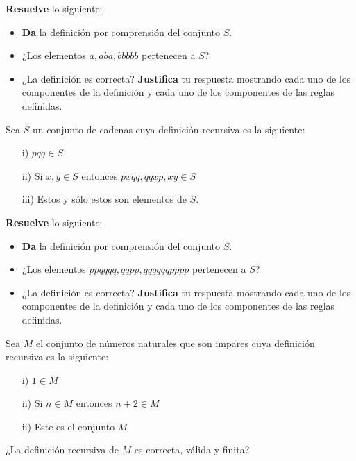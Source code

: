 \documentclass[oneside]{style}
\begin{document}
\begin{questions}[label=\protect\circled{\bfseries\arabic*}]
{        \textbf{Resuelve} lo siguiente:
        \begin{itemize}
            \item \textbf{Da} la definición por comprensión del conjunto 
            $S$.
            \item ¿Los elementos $a, aba, bbbbb$ pertenecen a $S$?
            \item ¿La definición es correcta? \textbf{Justifica} tu respuesta 
            mostrando cada uno de los componentes de la definición y cada uno 
            de los componentes de las reglas definidas.  
        \end{itemize}
    }

    \question
    {
        Sea $S$ un conjunto de cadenas cuya definición recursiva es 
        la siguiente:
        \begin{itemize}
            \item[i)] $pqq \in S$
            \item[ii)] Si $x,y \in S$ entonces $pxqq,qqxp,xy \in S$
            \item[iii)] Estos y sólo estos son elementos de $S$.
        \end{itemize}   

        \textbf{Resuelve} lo siguiente:
        \begin{itemize}
            \item \textbf{Da} la definición por comprensión del conjunto 
            $S$.
            \item ¿Los elementos $ppqqqq,qqpp,qqqqqqpppp$ pertenecen a $S$?
            \item ¿La definición es correcta? \textbf{Justifica} tu respuesta 
            mostrando cada uno de los componentes de la definición y cada uno 
            de los componentes de las reglas definidas.  
        \end{itemize}
    }

    \question
    {
        Sea $M$ el conjunto de números naturales que son impares cuya 
        definición recursiva es la siguiente:
        \begin{itemize}
            \item[i)] $1 \in M$
            \item[ii)] Si $n \in M$ entonces $n+2 \in M$
            \item[ii)] Este es el conjunto $M$  
        \end{itemize}

        ¿La definición recursiva de $M$ es correcta, válida y finita?
    }


\end{questions}
\end{document}
